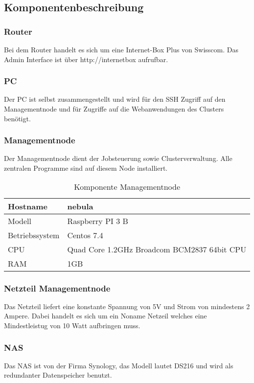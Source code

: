 \subsection{Komponentenbeschreibung}
\subsubsection{Router}

Bei dem Router handelt es sich um eine Internet-Box Plus von Swisscom. Das Admin Interface ist über http://internetbox aufrufbar.

\subsubsection{PC}
Der PC ist selbst zusammengestellt und wird für den SSH Zugriff auf den Managementnode und für Zugriffe auf die Webanwendungen des Clusters benötigt.

\subsubsection{Managementnode}
Der Managementnode dient der Jobsteuerung sowie Clusterverwaltung. Alle zentralen Programme sind auf diesem Node installiert.

\begin{table}[H]
\centering
\begin{tabular}{|l|l|}
\hline
Hostname & nebula \\\hline
Modell & Raspberry PI 3 B\\\hline
Betriebssystem & Centos 7.4 \\\hline
CPU & Quad Core 1.2GHz Broadcom BCM2837 64bit CPU \\\hline
RAM & 1GB  \\\hline
\end{tabular}
\caption{Komponente Managementnode}
\end{table}

\subsubsection{Netzteil Managementnode}
Das Netzteil liefert eine konstante Spannung von 5V und Strom von mindestens 2 Ampere. Dabei handelt es sich um ein Noname Netzeil welches eine Mindestleistug von 10 Watt aufbringen muss.

\subsubsection{NAS}
Das NAS ist von der Firma Synology, das Modell lautet DS216 und wird als redundanter Datenspeicher benutzt.

